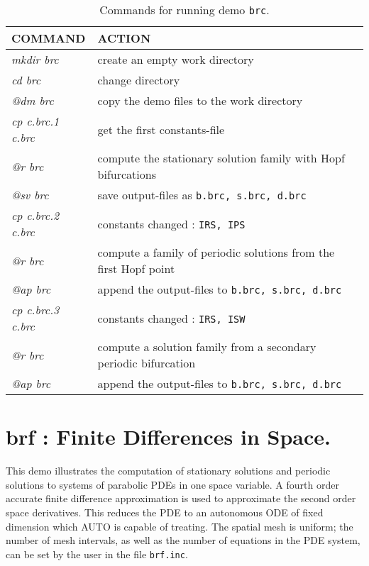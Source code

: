 \documentclass[12pt]{report}
\begin{document}
\begin{table}[htbp]
\begin{center}
\begin{tabular}{| l | l |}
\hline
  COMMAND  & ACTION \\
\hline
  {\it mkdir brc} & create an empty work directory \\ 
  {\it cd brc} & change directory \\
  {\it @dm brc} & copy the demo files to the work directory \\
\hline
  {\it cp c.brc.1 c.brc} & get the first constants-file \\ 
  {\it @r brc} & compute the stationary solution family with Hopf bifurcations \\ 
  {\it @sv brc} & save output-files as {\tt b.brc, s.brc, d.brc} \\ 
\hline
  {\it cp c.brc.2 c.brc} & constants changed : {\tt IRS, IPS} \\ 
  {\it @r brc} & compute a family of periodic solutions from the first Hopf point \\ 
  {\it @ap brc} & append the output-files to {\tt b.brc, s.brc, d.brc} \\ 
\hline
  {\it cp c.brc.3 c.brc} & constants changed : {\tt IRS, ISW}
  \\ 
  {\it @r brc} & compute a solution family from a secondary periodic bifurcation \\ 
  {\it @ap brc} & append the output-files to {\tt b.brc, s.brc, d.brc} \\ 
\hline
\end{tabular}
\caption{Commands for running demo {\tt brc}.}
\label{tbl:demo_brc}
\end{center}
\end{table}


\newpage
\section{ brf : Finite Differences in Space.} \label{sec:Demos_brf}
This demo illustrates the computation of stationary solutions and periodic
solutions to systems of parabolic PDEs in one space variable.
A fourth order accurate finite difference approximation is used to
approximate the second order space derivatives. 
This reduces the PDE to an autonomous ODE of fixed dimension
which {\cal AUTO} is capable of treating.
The spatial mesh is uniform; the number of mesh intervals,
as well as the number of equations in the PDE system,
can be set by the user in the file {\tt brf.inc}.
\end{document}
